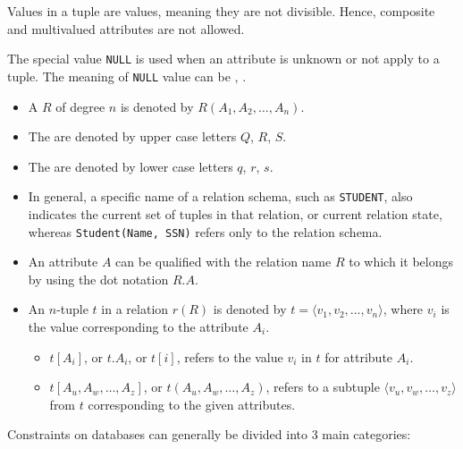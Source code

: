       \par Values in a tuple are  values, meaning they are not divisible. Hence, composite and multivalued attributes are not allowed.
      \par The special value \lstinline{NULL} is used when an attribute is unknown or not apply to a tuple. The meaning of \lstinline{NULL} value can be , .


    \begin{itemize}
      \item A  $R$ of degree $n$ is denoted by $R(A_1, A_2, \ldots, A_n)$.
      \item The  are denoted by upper case letters $Q$, $R$, $S$.
      \item The  are denoted by lower case letters $q$, $r$, $s$.
      \item In general, a specific name of a relation schema, such as \lstinline{STUDENT}, also indicates the current set of tuples in that relation, or current relation state, whereas \lstinline{Student(Name, SSN)} refers only to the relation schema.
      \item An attribute $A$ can be qualified with the relation name $R$ to which it belongs by using the dot notation $R.A$.
      \item An $n$-tuple $t$ in a relation $r(R)$ is denoted by $t = \langle v_1, v_2, \ldots, v_n \rangle$, where $v_i$ is the value corresponding to the attribute $A_i$.
        \begin{itemize}
          \item $t[A_i]$, or $t.A_i$, or $t[i]$, refers to the value $v_i$ in $t$ for attribute $A_i$.
          \item $t[A_u, A_w, \ldots, A_z]$, or $t(A_u, A_w, \ldots, A_z)$, refers to a subtuple $\langle v_u, v_w, \ldots, v_z \rangle$ from $t$ corresponding to the given attributes.
        \end{itemize}
    \end{itemize}

  \par Constraints on databases can generally be divided into 3 main categories:

